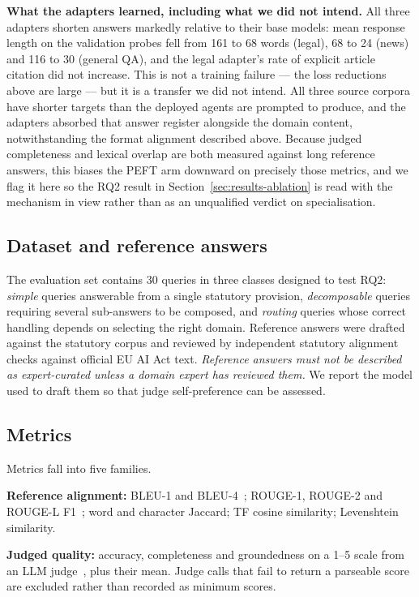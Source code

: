 \documentclass[journal,10pt,compsoc,onecolumn]{IEEEtran}
\begin{document}
\textbf{What the adapters learned, including what we did not intend.} All three
adapters shorten answers markedly relative to their base models: mean response
length on the validation probes fell from 161 to 68 words (legal), 68 to 24
(news) and 116 to 30 (general QA), and the legal adapter's rate of explicit
article citation did not increase. This is not a training failure --- the loss
reductions above are large --- but it is a transfer we did not intend. All three
source corpora have shorter targets than the deployed agents are prompted to
produce, and the adapters absorbed that answer register alongside the domain
content, notwithstanding the format alignment described above. Because judged
completeness and lexical overlap are both measured against long reference
answers, this biases the PEFT arm downward on precisely those metrics, and we
flag it here so the RQ2 result in Section~\ref{sec:results-ablation} is read with
the mechanism in view rather than as an unqualified verdict on specialisation.

\subsection{Dataset and reference answers}
The evaluation set contains 30 queries in three classes designed to test
RQ2: \emph{simple} queries answerable from a single statutory provision,
\emph{decomposable} queries requiring several sub-answers to be composed, and
\emph{routing} queries whose correct handling depends on selecting the right
domain. Reference answers were drafted against the statutory corpus and reviewed
by independent statutory alignment checks against official EU AI Act text. \emph{Reference answers
must not be described as expert-curated unless a domain expert has reviewed
them.} We report the model used to draft them so that judge self-preference can
be assessed.

\subsection{Metrics}
Metrics fall into five families.

\textbf{Reference alignment:} BLEU-1 and BLEU-4~\cite{papineni2002bleu};
ROUGE-1, ROUGE-2 and ROUGE-L F1~\cite{lin2004rouge}; word and character Jaccard;
TF cosine similarity; Levenshtein similarity.

\textbf{Judged quality:} accuracy, completeness and groundedness on a 1--5 scale
from an LLM judge~\cite{zheng2023mtbench}, plus their mean. Judge calls that fail
to return a parseable score are excluded rather than recorded as minimum scores.
\end{document}

